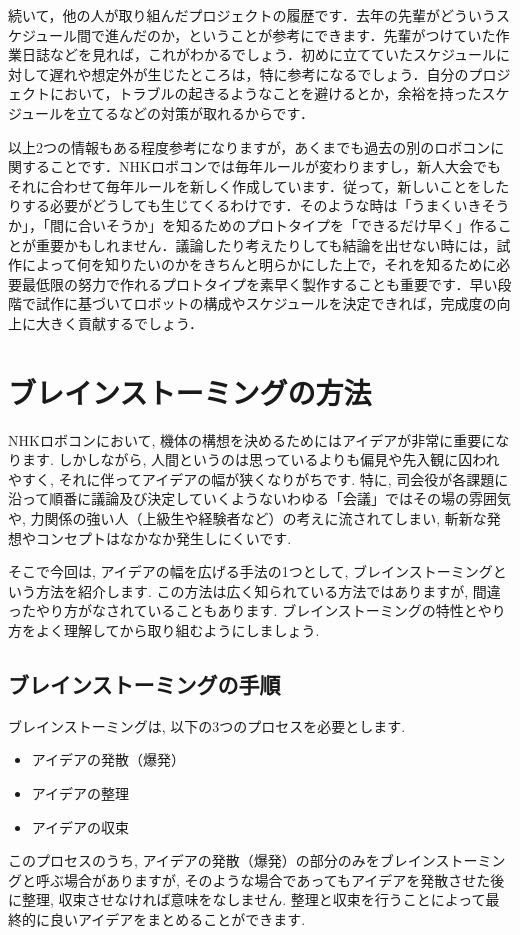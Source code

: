 続いて，他の人が取り組んだプロジェクトの履歴です．去年の先輩がどういうスケジュール間で進んだのか，ということが参考にできます．先輩がつけていた作業日誌などを見れば，これがわかるでしょう．初めに立てていたスケジュールに対して遅れや想定外が生じたところは，特に参考になるでしょう．自分のプロジェクトにおいて，トラブルの起きるようなことを避けるとか，余裕を持ったスケジュールを立てるなどの対策が取れるからです．

以上2つの情報もある程度参考になりますが，あくまでも過去の別のロボコンに関することです．NHKロボコンでは毎年ルールが変わりますし，新人大会でもそれに合わせて毎年ルールを新しく作成しています．従って，新しいことをしたりする必要がどうしても生じてくるわけです．そのような時は「うまくいきそうか」，「間に合いそうか」を知るためのプロトタイプを「できるだけ早く」作ることが重要かもしれません．議論したり考えたりしても結論を出せない時には，試作によって何を知りたいのかをきちんと明らかにした上で，それを知るために必要最低限の努力で作れるプロトタイプを素早く製作することも重要です．早い段階で試作に基づいてロボットの構成やスケジュールを決定できれば，完成度の向上に大きく貢献するでしょう．


\section{ブレインストーミングの方法}
NHKロボコンにおいて, 機体の構想を決めるためにはアイデアが非常に重要になります. 
しかしながら, 人間というのは思っているよりも偏見や先入観に囚われやすく, それに伴ってアイデアの幅が狭くなりがちです. 特に, 司会役が各課題に沿って順番に議論及び決定していくようないわゆる「会議」ではその場の雰囲気や, 力関係の強い人（上級生や経験者など）の考えに流されてしまい, 斬新な発想やコンセプトはなかなか発生しにくいです. 

そこで今回は, アイデアの幅を広げる手法の1つとして, ブレインストーミングという方法を紹介します. この方法は広く知られている方法ではありますが, 間違ったやり方がなされていることもあります. ブレインストーミングの特性とやり方をよく理解してから取り組むようにしましょう. 

\subsection{ブレインストーミングの手順}
ブレインストーミングは, 以下の3つのプロセスを必要とします. 
\begin{itemize}
    \item アイデアの発散（爆発）
    \item アイデアの整理
    \item アイデアの収束
\end{itemize}
このプロセスのうち, アイデアの発散（爆発）の部分のみをブレインストーミングと呼ぶ場合がありますが, そのような場合であってもアイデアを発散させた後に整理, 収束させなければ意味をなしません. 整理と収束を行うことによって最終的に良いアイデアをまとめることができます. 

